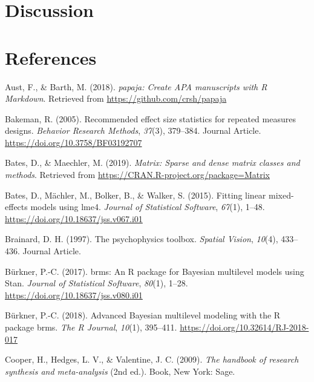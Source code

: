 \documentclass[
  english,
  man]{apa6}
\begin{document}
\hypertarget{discussion}{%
\section{Discussion}\label{discussion}}

\hypertarget{references}{%
\section{References}\label{references}}

\begingroup
\setlength{\parindent}{-0.5in}
\setlength{\leftskip}{0.5in}

\hypertarget{refs}{}
\leavevmode\hypertarget{ref-R-papaja}{}%
Aust, F., \& Barth, M. (2018). \emph{papaja: Create APA manuscripts with R Markdown}. Retrieved from \url{https://github.com/crsh/papaja}

\leavevmode\hypertarget{ref-Bakeman_2015_eff_size}{}%
Bakeman, R. (2005). Recommended effect size statistics for repeated measures designs. \emph{Behavior Research Methods}, \emph{37}(3), 379--384. Journal Article. \url{https://doi.org/10.3758/BF03192707}

\leavevmode\hypertarget{ref-R-Matrix}{}%
Bates, D., \& Maechler, M. (2019). \emph{Matrix: Sparse and dense matrix classes and methods}. Retrieved from \url{https://CRAN.R-project.org/package=Matrix}

\leavevmode\hypertarget{ref-R-lme4}{}%
Bates, D., Mächler, M., Bolker, B., \& Walker, S. (2015). Fitting linear mixed-effects models using lme4. \emph{Journal of Statistical Software}, \emph{67}(1), 1--48. \url{https://doi.org/10.18637/jss.v067.i01}

\leavevmode\hypertarget{ref-Brainard_1997}{}%
Brainard, D. H. (1997). The psychophysics toolbox. \emph{Spatial Vision}, \emph{10}(4), 433--436. Journal Article.

\leavevmode\hypertarget{ref-R-brms_a}{}%
Bürkner, P.-C. (2017). brms: An R package for Bayesian multilevel models using Stan. \emph{Journal of Statistical Software}, \emph{80}(1), 1--28. \url{https://doi.org/10.18637/jss.v080.i01}

\leavevmode\hypertarget{ref-R-brms_b}{}%
Bürkner, P.-C. (2018). Advanced Bayesian multilevel modeling with the R package brms. \emph{The R Journal}, \emph{10}(1), 395--411. \url{https://doi.org/10.32614/RJ-2018-017}

\leavevmode\hypertarget{ref-Cooper_2009_handbook}{}%
Cooper, H., Hedges, L. V., \& Valentine, J. C. (2009). \emph{The handbook of research synthesis and meta-analysis} (2nd ed.). Book, New York: Sage.
\end{document}
